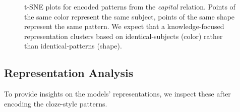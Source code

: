 \begin{figure}[t!]
\centering

{}


\caption{t-SNE plots for encoded patterns from the
  \textit{capital} relation. Points of the same color
  represent the same subject, points of the same shape
  represent the same pattern. We expect that a knowledge-focused representation  clusters based on identical-subjects (color) rather than identical-patterns (shape).}
\label{fig:tsne-emb}

\end{figure}

\subsection{Representation Analysis}


To provide insights on the models' representations, we inspect these after encoding the cloze-style patterns.

